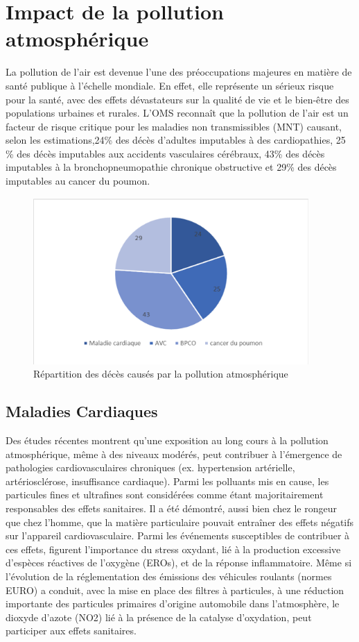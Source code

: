 \documentclass{report}
\begin{document}
\section{Impact de la pollution atmosphérique}
La pollution de l'air est devenue l'une des préoccupations majeures en matière de santé publique à l'échelle mondiale. En effet, elle représente un sérieux risque pour la santé, avec des effets dévastateurs sur la qualité de vie et le bien-être des populations urbaines et rurales. 
L’OMS reconnaît que la pollution de l’air est un facteur de risque critique pour les maladies non transmissibles (MNT) causant, selon les estimations,24\% des décès d’adultes imputables à des cardiopathies, 25 \% des décès imputables aux accidents vasculaires cérébraux, 43\% des décès imputables à la bronchopneumopathie chronique obstructive et 29\% des décès imputables au cancer du poumon.

\begin{figure}[h]
        \centering
         \includegraphics[height=180pt]{images/circle.PNG}
        \caption{Répartition des décès causés par la pollution atmosphérique}
 \end{figure}

\subsection{Maladies Cardiaques}
Des études récentes montrent qu’une exposition au long cours à la pollution atmosphérique, même à des niveaux modérés, peut contribuer à l’émergence de pathologies cardiovasculaires chroniques (ex. hypertension artérielle, artériosclérose, insuffisance cardiaque).
Parmi les polluants mis en cause, les particules fines et ultrafines sont considérées comme étant majoritairement responsables des effets sanitaires. Il a été démontré, aussi bien chez le rongeur que chez l’homme, que la matière particulaire pouvait entraîner des effets négatifs sur l’appareil cardiovasculaire. Parmi les événements susceptibles de contribuer à ces effets, figurent l’importance du stress oxydant, lié à la production excessive d’espèces réactives de l’oxygène (EROs), et de la réponse inflammatoire. Même si l’évolution de la réglementation des émissions des véhicules roulants (normes EURO) a conduit, avec la mise en place des filtres à particules, à une réduction importante des particules primaires d’origine automobile dans l’atmosphère, le dioxyde d’azote (NO2) lié à la présence de la catalyse d’oxydation, peut participer aux effets sanitaires.
\cite{Nathalie Ruaux - Santé et pollution atmosphérique-27 Juillet  2017}
\end{document}

